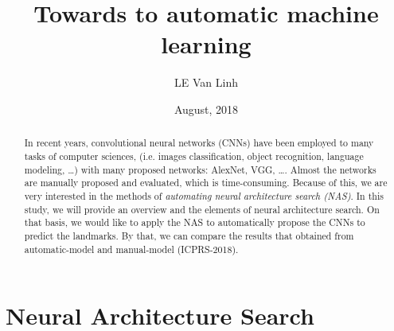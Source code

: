 \documentclass[12pt,a4paper]{article}
\begin{document}
\title{Towards to automatic machine learning}
\author{LE Van Linh}
\date{August, 2018}
\maketitle
\begin{abstract}
In recent years, convolutional neural networks (CNNs) have been employed to many tasks of computer sciences, (i.e. images classification, object recognition, language modeling, \ldots) with many proposed networks: AlexNet, VGG, \ldots. Almost the networks are manually proposed and evaluated, which is time-consuming. Because of this, we are very interested in the methods of \textit{automating neural architecture search (NAS)}. In this study, we will provide an overview and the elements of neural architecture search. On that basis, we would like to apply the NAS to automatically propose the CNNs to predict the landmarks. By that, we can compare the results that obtained from automatic-model and manual-model (ICPRS-2018).
\end{abstract}

\section{Neural Architecture Search}
\end{document}
